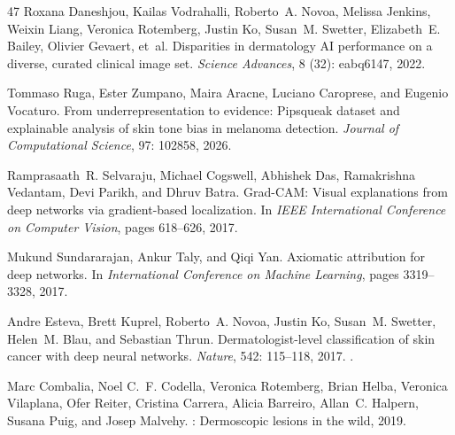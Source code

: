 \documentclass[11pt]{article}
\begin{document}
\begin{thebibliography}{47}
Roxana Daneshjou, Kailas Vodrahalli, Roberto~A. Novoa, Melissa Jenkins, Weixin
  Liang, Veronica Rotemberg, Justin Ko, Susan~M. Swetter, Elizabeth~E. Bailey,
  Olivier Gevaert, et~al.
\newblock Disparities in dermatology {AI} performance on a diverse, curated
  clinical image set.
\newblock \emph{Science Advances}, 8 (32): eabq6147,
  2022{}.

Tommaso Ruga, Ester Zumpano, Maira Aracne, Luciano Caroprese, and Eugenio
  Vocaturo.
\newblock From underrepresentation to evidence: {Pipsqueak} dataset and
  explainable analysis of skin tone bias in melanoma detection.
\newblock \emph{Journal of Computational Science}, 97: 102858, 2026.

Ramprasaath~R. Selvaraju, Michael Cogswell, Abhishek Das, Ramakrishna Vedantam,
  Devi Parikh, and Dhruv Batra.
\newblock Grad-{CAM}: Visual explanations from deep networks via gradient-based
  localization.
\newblock In \emph{IEEE International Conference on Computer Vision}, pages
  618--626, 2017.

Mukund Sundararajan, Ankur Taly, and Qiqi Yan.
\newblock Axiomatic attribution for deep networks.
\newblock In \emph{International Conference on Machine Learning}, pages
  3319--3328, 2017.

Andre Esteva, Brett Kuprel, Roberto~A. Novoa, Justin Ko, Susan~M. Swetter,
  Helen~M. Blau, and Sebastian Thrun.
\newblock Dermatologist-level classification of skin cancer with deep neural
  networks.
\newblock \emph{Nature}, 542: 115--118, 2017.
\newblock {}.

Marc Combalia, Noel C.~F. Codella, Veronica Rotemberg, Brian Helba, Veronica
  Vilaplana, Ofer Reiter, Cristina Carrera, Alicia Barreiro, Allan~C. Halpern,
  Susana Puig, and Josep Malvehy.
: Dermoscopic lesions in the wild, 2019.


\end{thebibliography}
\end{document}
